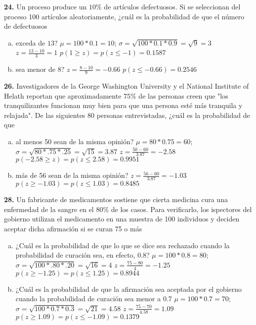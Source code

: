 \documentclass[12pt, letterpaper]{article}
\begin{document}
    \textbf{24. }Un proceso produce un $10\%$ de artículos defectuosos. Si se seleccionan del proceso 100 artículos
    aleatoriamente, ¿cuál es la probabilidad de que el número de defectuosos
        \begin{enumerate}[a)]
            \item exceda de $13$?\vskip0.5cm
                $\mu = 100*0.1=10$; $\sigma = \sqrt{100*0.1*0.9}=\sqrt{9}=3$\vskip0.5cm
                $z=\displaystyle\frac{13-10}{3}=1$\vskip0.5cm
                $p(1\geq z)=p(z\leq -1)=0.1587$
            \item sea menor de $8$?\vskip0.5cm
                $z=\displaystyle\frac{8-10}{9}=-0.66$\vskip0.5cm
                $p(z\leq -0.66)=0.2546$
        \end{enumerate}\vskip1cm

    \textbf{26. }Investigadores de la George Washington University y el National Institute of Helath reportan que
    aproximadamente $75\%$ de las personas creen que "los tranquilizantes funcionan muy bien para que una persona esté
    más tranquila y relajada". De las siguientes 80 personas entrevistadas, ¿cuál es la probabilidad de que
        \begin{enumerate}[a)]
            \item al menos 50 sean de la misma opinión?\vskip0.5cm
                $\mu = 80*0.75=60$; $\sigma = \sqrt{80*.75*.25}=\sqrt{15}=3.87$\vskip0.5cm
                $z=\displaystyle\frac{50-60}{3.87}=-2.58$\vskip0.5cm
                $p(-2.58\geq z)=p(z\leq 2.58)=0.9951$\vskip0.5cm
            \item más de 56 sean de la misma opinión?\vskip0.5cm
                $z=\displaystyle\frac{56-60}{3.87}=-1.03$\vskip0.5cm
                $p(z\geq -1.03)=p(z\leq 1.03)=0.8485$
        \end{enumerate}\vskip1cm

    \textbf{28. }Un fabricante de medicamentos sostiene que cierta medicina cura una enfermedad de la sangre en el $80\%$
    de los casos. Para verificarlo, los ispectores del gobierno utilizan el medicamento en una muestra de 100 individuos y
    deciden aceptar dicha afirmación si se curan 75 o más
        \begin{enumerate}[a)]
            \item ¿Cuál es la probabilidad de que lo que se dice sea rechazado cuando la probabilidad de curación sea,
                  en efecto, 0.8?\vskip0.5cm
                $\mu = 100*0.8=80$; $\sigma = \sqrt{100*.80*.20}=\sqrt{16}=4$\vskip0.5cm
                $z=\displaystyle\frac{75-80}{4}=-1.25$\vskip0.5cm
                $p(z\geq -1.25)=p(z\leq 1.25)=0.8944$
            \item ¿Cuál es la probabilidad de que la afirmación sea aceptada por el gobierno cuando la probabilidad de
                  curación sea menor a 0.7\vskip0.5cm
                $\mu=100*0.7=70$; $\sigma = \sqrt{100*0.7*0.3}=\sqrt{21}=4.58$\vskip0.5cm
                $z=\displaystyle\frac{75-70}{4.58}=1.09$\vskip0.5cm
                $p(z\geq 1.09)=p(z\leq -1.09)=0.1379$
        \end{enumerate}\vskip1cm
\end{document}
